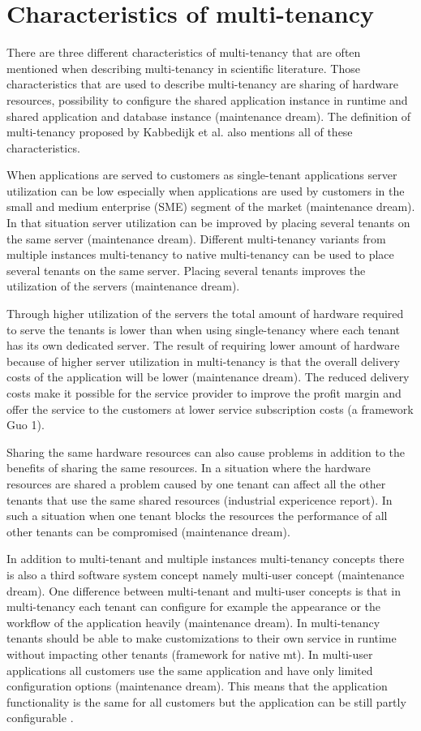 \documentclass[conference]{sasmoota2017}
\begin{document}
\section{Characteristics of multi-tenancy}

There are three different characteristics of multi-tenancy that are often mentioned when describing multi-tenancy in scientific literature. Those characteristics that are used to describe multi-tenancy are sharing of hardware resources, possibility to configure the shared application instance in runtime and shared application and database instance (maintenance dream). The definition of multi-tenancy proposed by Kabbedijk et al. \cite{Kabbedijk2015:Defining} also mentions all of these characteristics. 

When applications are served to customers as single-tenant applications server utilization can be low especially when applications are used by customers in the small and medium enterprise (SME) segment of the market (maintenance dream). In that situation server utilization can be improved by placing several tenants on the same server (maintenance dream). Different multi-tenancy variants from multiple instances multi-tenancy to native multi-tenancy can be used to place several tenants on the same server. Placing several tenants improves the utilization of the servers (maintenance dream). 

Through higher utilization of the servers the total amount of hardware required to serve the tenants is lower than when using single-tenancy where each tenant has its own dedicated server. The result of requiring lower amount of hardware because of higher server utilization in multi-tenancy is that the overall delivery costs of the application will be lower (maintenance dream). The reduced delivery costs make it possible for the service provider to improve the profit margin and offer the service to the customers at lower service subscription costs (a framework Guo 1).

Sharing the same hardware resources can also cause problems in addition to the benefits of sharing the same resources. In a situation where the hardware resources are shared a problem caused by one tenant can affect all the other tenants that use the same shared resources (industrial expericence report). In such a situation when one tenant blocks the resources the performance of all other tenants can be compromised (maintenance dream). 

In addition to multi-tenant and multiple instances multi-tenancy concepts there is also a third software system concept namely multi-user concept (maintenance dream). One difference between multi-tenant and multi-user concepts is that in multi-tenancy each tenant can configure for example the appearance or the workflow of the application heavily (maintenance dream). In multi-tenancy tenants should be able to make customizations to their own service in runtime without impacting other tenants (framework for native mt). In multi-user applications all customers use the same application and have only limited configuration options (maintenance dream). This means that the application functionality is the same for all customers but the application can be still partly configurable \cite{Kabbedijk2015:Defining}. 
\end{document}
